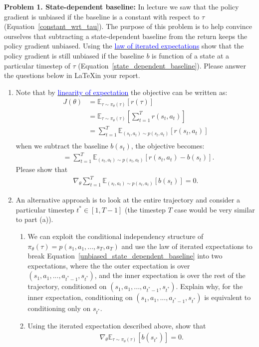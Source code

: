 \documentclass[12pt]{article}
\begin{document}
\textbf{Problem 1. State-dependent baseline:}
In lecture we saw that the policy gradient is unbiased if the baseline is a constant with respect to $\tau$ (Equation~\ref{constant_wrt_tau}). The purpose of this problem is to help convince ourselves that subtracting a state-dependent baseline from the return keeps the policy gradient unbiased. Using the \href{https://en.wikipedia.org/wiki/Law_of_total_expectation}{\textcolor{blue}{law of iterated expectations}} show that the policy gradient is still unbiased if the baseline $b$ is function of a state at a particular timestep of $\tau$ (Equation~\ref{state_dependent_baseline}).
Please answer the questions below in \LaTeX in your report.
\begin{enumerate} [label=(\alph*)]
\item Note that by \href{https://brilliant.org/wiki/linearity-of-expectation/}{\textcolor{blue}{linearity of expectation}} the objective can be written as:
\begin{align*}
    J(\theta) &= \mathbb{E}_{\tau \sim \pi_\theta(\tau)} \left[r(\tau)\right] \\
    &= \mathbb{E}_{\tau \sim \pi_\theta(\tau)} \left[\sum_{t=1}^{T} r(s_t, a_t)\right] \\
    &= \sum_{t=1}^{T} \mathbb{E}_{(s_t, a_t) \sim p(s_t, a_t)} \left[r(s_t, a_t)\right] \\
\end{align*}
when we subtract the baseline $b(s_t)$, the objective becomes:
\begin{align*}
    &= \sum_{t=1}^{T} \mathbb{E}_{(s_t, a_t) \sim p(s_t, a_t)} \left[r(s_t, a_t) - b(s_t)\right].
\end{align*}
Please show that
\begin{align*}
\nabla_\theta \sum_{t=1}^{T} \mathbb{E}_{(s_t, a_t) \sim p(s_t, a_t)} \left[b(s_t)\right] = 0.
\end{align*}
\item An alternative approach is to look at the entire trajectory and consider a particular timestep $t^* \in [1, T-1]$ (the timestep $T$ case would be very similar to part (a)). 
\begin{enumerate}
    \item We can exploit the conditional independency structure of $\pi_\theta(\tau) = p(s_1, a_1, ..., s_T, a_T)$ and use the law of iterated expectations to break Equation~\ref{unbiased_state_dependent_baseline} into two expectations, where the the outer expectation is over $(s_1, a_1, ..., a_{t^*-1}, s_{t^*})$, and the inner expectation is over the rest of the trajectory, conditioned on $(s_1, a_1, ..., a_{t^*-1}, s_{t^*})$. Explain why, for the inner expectation, conditioning on $(s_1, a_1, ..., a_{t^*-1}, s_{t^*})$ is equivalent to conditioning only on $s_{t^*}$.
    \item Using the iterated expectation described above, show that
\begin{align} \label{unbiased_state_dependent_baseline}
\nabla_\theta \mathbb{E}_{\tau \sim \pi_\theta(\tau)} \left[b\left(s_{t^*}\right)\right] = 0.
\end{align}
\end{enumerate}
\end{enumerate}
\end{document}
